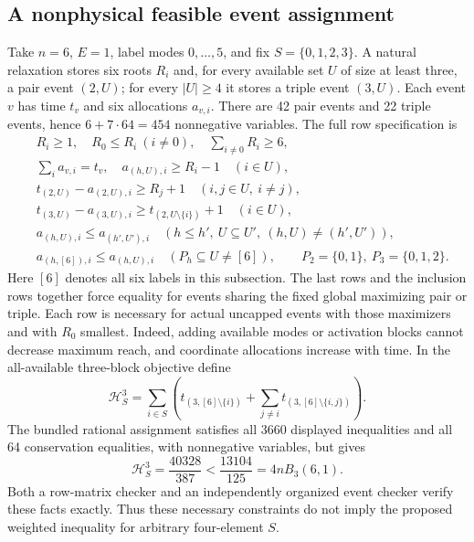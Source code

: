 \subsection{A nonphysical feasible event assignment}\label{subsec:negative-relaxation}

Take $n=6$, $E=1$, label modes $0,\ldots,5$, and fix $S=\{0,1,2,3\}$.
A natural relaxation stores six roots $R_i$ and, for every available set
$U$ of size at least three, a pair event $(2,U)$; for every $|U|\ge4$
it stores a triple event $(3,U)$. Each event $v$ has time $t_v$ and
six allocations $a_{v,i}$. There are 42 pair events and 22 triple events,
hence $6+7\cdot64=454$ nonnegative variables. The full row specification is
\begin{align*}
 &R_i\ge1,\quad R_0\le R_i\ (i\ne0),\quad\sum_{i\ne0}R_i\ge6,\\
 &\sum_i a_{v,i}=t_v,\quad a_{(h,U),i}\ge R_i-1\quad(i\in U),\\
 &t_{(2,U)}-a_{(2,U),i}\ge R_j+1\quad(i,j\in U,\ i\ne j),\\
 &t_{(3,U)}-a_{(3,U),i}\ge t_{(2,U\setminus\{i\})}+1\quad(i\in U),\\
 &a_{(h,U),i}\le a_{(h',U'),i}
       \quad(h\le h',\ U\subseteq U',\ (h,U)\ne(h',U')),\\
 &a_{(h,[6]),i}\le a_{(h,U),i}
       \quad(P_h\subseteq U\ne[6]),
       \qquad P_2=\{0,1\},\ P_3=\{0,1,2\}.
\end{align*}
Here $[6]$ denotes all six labels in this subsection. The last rows and
the inclusion rows together force equality for events sharing the fixed
global maximizing pair or triple. Each row is necessary for actual
uncapped events with those maximizers and with $R_0$ smallest. Indeed,
adding available modes or activation blocks cannot decrease maximum reach,
and coordinate allocations increase with time. In the all-available
three-block objective define
\[
 \mathcal H_S^3=\sum_{i\in S}\left(t_{(3,[6]\setminus\{i\})}
               +\sum_{j\ne i}t_{(3,[6]\setminus\{i,j\})}\right).
\]
The bundled rational assignment satisfies all 3660 displayed inequalities
and all 64 conservation equalities, with nonnegative variables, but gives
\begin{equation}\label{eq:negative-event-objective}
 \mathcal H_S^3=\frac{40328}{387}<\frac{13104}{125}=4nB_3(6,1).
\end{equation}
Both a row-matrix checker and an independently organized event checker
verify these facts exactly. Thus these necessary constraints do not imply
the proposed weighted inequality for arbitrary four-element $S$.

